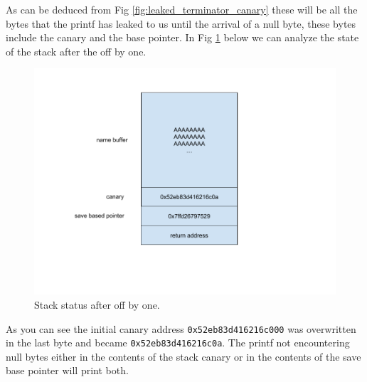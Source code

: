     As can be deduced from Fig \ref{fig:leaked_terminator_canary} these will be all the bytes that the printf has leaked to us until the arrival of a null byte, these bytes include the canary and the base pointer.\newline
    \clearpage
    In Fig \ref{fig:stack terminator} below we can analyze the state of the stack after the off by one.\newline
    \begin{figure}[htbp]
        \centering
        \includegraphics[width=1\linewidth]{Images/draw_terminator_stack_canaryleak.png}
        \caption{Stack status after off by one.}
        \label{fig:stack terminator}
    \end{figure}
    
    As you can see the initial canary address \texttt{0x52eb83d416216c000}
    was overwritten in the last byte and became \texttt{0x52eb83d416216c0a}.\newline
    The printf not encountering null bytes either in the contents of the stack canary or in the contents of the save base pointer will print both.\newline
